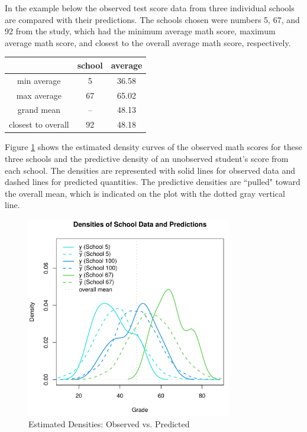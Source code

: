 \documentclass[12pt, a4paper]{article}
\begin{document}
\noindent In the example below the observed test score data from three individual schools are compared with their predictions.  The schools chosen were numbers 5, 67, and 92 from the study, which had the minimum average math score, maximum average math score, and closest to the overall average math score, respectively.


\begin{center}
  \begin{tabular}{|c|c|c|}
    \hline
    & school & average \\
    \hline
    min average & 5 & 36.58 \\
    \hline
    max average & 67 & 65.02 \\
    \hline
    grand mean & -- & 48.13 \\
    \hline
    closest to overall & 92 & 48.18\\
    \hline
  \end{tabular}
\end{center}

\noindent Figure \ref{fig:NormIGk_DvP} shows the estimated density curves of the observed math scores for these three schools and the predictive density of an unobserved student's score from each school.  The densities are represented with solid lines for observed data and dashed lines for predicted quantities.  The predictive densities are ``pulled" toward the overall mean, which is indicated on the plot with the dotted gray vertical line.

\begin{figure}[ht]
  \centering
  \includegraphics[width=0.8\textwidth]{./Graphics/ExamplePlots/NormIGk_Data_v_Prediction}
  \caption{Estimated Densities: Observed vs. Predicted}
  \label{fig:NormIGk_DvP}
\end{figure}
\end{document}
